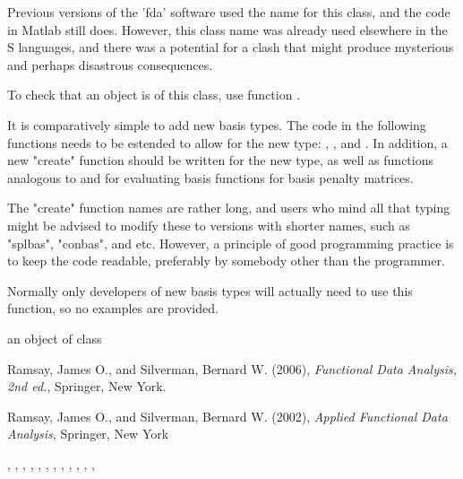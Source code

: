 \documentclass{article}
\begin{document}
\begin{Details}\relax
Previous versions of the 'fda' software used the name 
for this class, and the code in Matlab still does.  However, this
class name was already used elsewhere in the S languages, and there
was a potential for a clash that might produce mysterious and perhaps
disastrous consequences.

To check that an object is of this class, use function
.

It is comparatively simple to add new basis types.  The code in
the following functions needs to be estended to allow for the new
type: , ,
 and .
In addition, a new "create" function should be written for the
new type, as well as functions analogous to  and
 for evaluating basis functions for basis
penalty matrices.

The "create" function names are rather long, and users who mind
all that typing might be advised to modify these to versions with
shorter names, such as "splbas", "conbas", and etc.  However, a
principle of good programming practice is to keep the code readable,
preferably by somebody other than the programmer.

Normally only developers of new basis types will actually need
to use this function, so no examples are provided.
\end{Details}
\begin{Value}
an object of class 
\end{Value}
\begin{Source}\relax
Ramsay, James O., and Silverman, Bernard W. (2006), \emph{Functional
Data Analysis, 2nd ed.}, Springer, New York.

Ramsay, James O., and Silverman, Bernard W. (2002), \emph{Applied
Functional Data Analysis}, Springer, New York
\end{Source}
\begin{SeeAlso}\relax
{}, 
, 
, 
, 
, 
, 
, 
, 
, 
, 
, 
, 
\end{SeeAlso}
\end{document}
